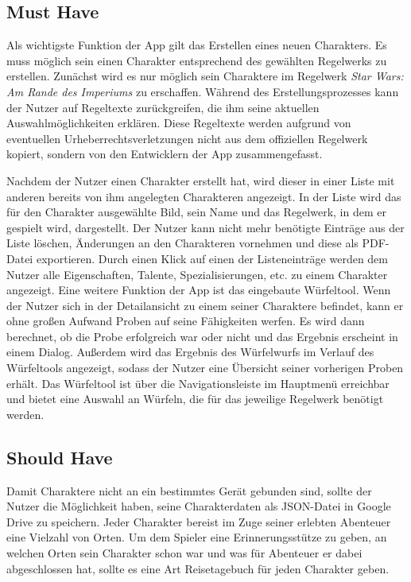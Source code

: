 \subsection{Must Have}
Als wichtigste Funktion der App gilt das Erstellen eines neuen Charakters. Es muss möglich sein einen Charakter entsprechend des gewählten Regelwerks zu erstellen. Zunächst wird es nur möglich sein Charaktere im Regelwerk \textit{Star Wars: Am Rande des Imperiums} zu erschaffen. Während des Erstellungsprozesses kann der Nutzer auf Regeltexte zurückgreifen, die ihm seine aktuellen Auswahlmöglichkeiten erklären. Diese Regeltexte werden aufgrund von eventuellen Urheberrechtsverletzungen nicht aus dem offiziellen Regelwerk kopiert, sondern von den Entwicklern der App zusammengefasst.

Nachdem der Nutzer einen Charakter erstellt hat, wird dieser in einer Liste mit anderen bereits von ihm angelegten Charakteren angezeigt. In der Liste wird das für den Charakter ausgewählte Bild, sein Name und das Regelwerk, in dem er gespielt wird, dargestellt. Der Nutzer kann nicht mehr benötigte Einträge aus der Liste löschen, Änderungen an den Charakteren vornehmen und diese als PDF-Datei exportieren. Durch einen Klick auf einen der Listeneinträge werden dem Nutzer alle Eigenschaften, Talente, Spezialisierungen, etc. zu einem Charakter angezeigt.
\newpage
Eine weitere Funktion der App ist das eingebaute Würfeltool. Wenn der Nutzer sich in der Detailansicht zu einem seiner Charaktere befindet, kann er ohne großen Aufwand Proben auf seine Fähigkeiten werfen. Es wird dann berechnet, ob die Probe erfolgreich war oder nicht und das Ergebnis erscheint in einem Dialog. Außerdem wird das Ergebnis des Würfelwurfs im Verlauf des Würfeltools angezeigt, sodass der Nutzer eine Übersicht seiner vorherigen Proben erhält. Das Würfeltool ist über die Navigationsleiste im Hauptmenü erreichbar und bietet eine Auswahl an Würfeln, die für das jeweilige Regelwerk benötigt werden.

\subsection{Should Have}
Damit Charaktere nicht an ein bestimmtes Gerät gebunden sind, sollte der Nutzer die Möglichkeit haben, seine Charakterdaten als JSON-Datei in Google Drive zu speichern. Jeder Charakter bereist im Zuge seiner erlebten Abenteuer eine Vielzahl von Orten. Um dem Spieler eine Erinnerungsstütze zu geben, an welchen Orten sein Charakter schon war und was für Abenteuer er dabei abgeschlossen hat, sollte es eine Art Reisetagebuch für jeden Charakter geben.

